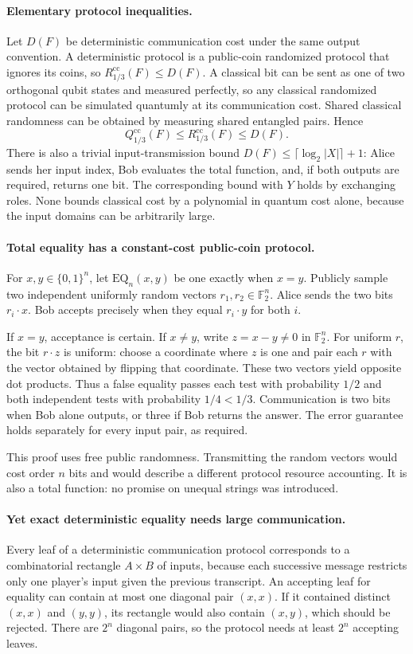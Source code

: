 \documentclass[11pt]{article}
\begin{document}
\paragraph{Elementary protocol inequalities.}
Let $D(F)$ be deterministic communication cost under the same output convention. A deterministic protocol is a public-coin randomized protocol that ignores its coins, so $R^{\mathrm{cc}}_{1/3}(F)\le D(F)$. A classical bit can be sent as one of two orthogonal qubit states and measured perfectly, so any classical randomized protocol can be simulated quantumly at its communication cost. Shared classical randomness can be obtained by measuring shared entangled pairs. Hence
\[
Q^{\mathrm{cc}}_{1/3}(F)\le R^{\mathrm{cc}}_{1/3}(F)\le D(F).
\]
There is also a trivial input-transmission bound $D(F)\le\lceil\log_2|X|\rceil+1$: Alice sends her input index, Bob evaluates the total function, and, if both outputs are required, returns one bit. The corresponding bound with $Y$ holds by exchanging roles. None bounds classical cost by a polynomial in quantum cost alone, because the input domains can be arbitrarily large.

\paragraph{Total equality has a constant-cost public-coin protocol.}
For $x,y\in\{0,1\}^n$, let $\mathrm{EQ}_n(x,y)$ be one exactly when $x=y$. Publicly sample two independent uniformly random vectors $r_1,r_2\in\mathbb F_2^n$. Alice sends the two bits $r_i\cdot x$. Bob accepts precisely when they equal $r_i\cdot y$ for both $i$.

If $x=y$, acceptance is certain. If $x\ne y$, write $z=x-y\ne0$ in $\mathbb F_2^n$. For uniform $r$, the bit $r\cdot z$ is uniform: choose a coordinate where $z$ is one and pair each $r$ with the vector obtained by flipping that coordinate. These two vectors yield opposite dot products. Thus a false equality passes each test with probability $1/2$ and both independent tests with probability $1/4<1/3$. Communication is two bits when Bob alone outputs, or three if Bob returns the answer. The error guarantee holds separately for every input pair, as required.

This proof uses free public randomness. Transmitting the random vectors would cost order $n$ bits and would describe a different protocol resource accounting. It is also a total function: no promise on unequal strings was introduced.

\paragraph{Yet exact deterministic equality needs large communication.}
Every leaf of a deterministic communication protocol corresponds to a combinatorial rectangle $A\times B$ of inputs, because each successive message restricts only one player's input given the previous transcript. An accepting leaf for equality can contain at most one diagonal pair $(x,x)$. If it contained distinct $(x,x)$ and $(y,y)$, its rectangle would also contain $(x,y)$, which should be rejected. There are $2^n$ diagonal pairs, so the protocol needs at least $2^n$ accepting leaves.
\end{document}
